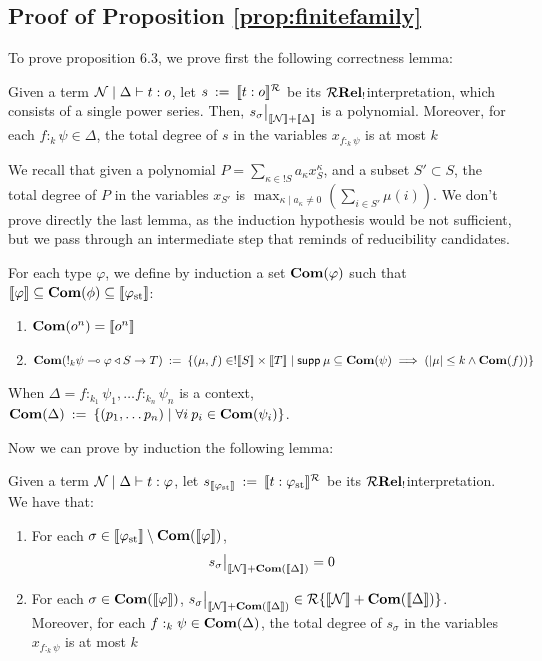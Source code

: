 \subsection{Proof of Proposition \ref{prop:finitefamily}}
To prove proposition 6.3, we prove first the following correctness lemma:
\begin{lemma}
	\label{lemma:correctness}
	Given a term $\mathcal{N}\mid\Delta\vdash t: o$, let $s \: := \: \llbracket t: o\rrbracket_{}^{\mathcal{R}} $ be its $\mathcal{R}\mathbf{Rel_!}$interpretation, which consists of a single power series. Then, $s_\sigma\big\vert_{\llbracket\mathcal{N}\rrbracket+ \llbracket\Delta\rrbracket}$ is a polynomial. Moreover, for each $f:_k \psi \in \Delta$, the total degree of $s$ in the variables $x_{f:_k \psi}$ is at most $k$
\end{lemma}
We recall that given a polynomial $ P = \sum_{\kappa \in !S} a_\kappa x_S^\kappa$, and a subset $S' \subset S$, the total degree of $P$ in the variables $x_{S'}$ is $\max_{\kappa \mid a_\kappa \neq 0} (\sum_{i \in S'} \mu(i))$.
We don't prove directly the last lemma, as the induction hypothesis would be not sufficient, but we pass through an intermediate step that reminds of reducibility candidates.
\begin{definition}
	For each type $\varphi$, we define by induction a set ${\mathbf{Com}}(\varphi)$ such that $\llbracket\varphi\rrbracket \subseteq \mathbf{Com}(\phi) \subseteq \llbracket{\varphi}_{\mathrm{st}}\rrbracket$:
	\begin{enumerate}
		\item $\mathbf{Com}(o^n)= \llbracket o^n\rrbracket$
		\item $\mathbf{Com}( !_k \psi \multimap \varphi \triangleleft S \to T) \: := \: \{(\mu, f) \in !\llbracket S\rrbracket \times \llbracket T\rrbracket\mid \mathsf{supp} \: \mu \subseteq \mathbf{Com}(\psi) \implies (|\mu| \leq k \land \mathbf{Com}(f))\}$
	\end{enumerate}
When $\Delta= f:_{k_1} \psi_1, \dots f:_{k_n} \psi_n$ is a context, $\mathbf{Com}(\Delta) \: := \: \{(p_1, \dots p_n)\mid \forall i \: p_i \in \mathbf{Com}(\psi_i)\}$.
\end{definition}
Now we can prove by induction the following lemma:
\begin{lemma}
	Given a term $\mathcal{N}\mid\Delta\vdash t: \varphi$, let $s_{\llbracket{\varphi}_{\mathrm{st}}\rrbracket} \: := \: \llbracket t: {\varphi}_{\mathrm{st}}\rrbracket^{\mathcal{R}} $ be its $\mathcal{R}\mathbf{Rel_!}$interpretation. We have that:
	\begin{enumerate}
		\item For each $\sigma \in \llbracket{\varphi}_{\mathrm{st}}\rrbracket \setminus \mathbf{Com}(\llbracket\varphi\rrbracket)$, 
		\begin{equation}
			s_\sigma\big\vert_{\llbracket\mathcal{N}\rrbracket+ \mathbf{Com}(\llbracket\Delta\rrbracket)}=0
		\end{equation}
		\item For each $\sigma \in \mathbf{Com}(\llbracket\varphi\rrbracket)$, $s_\sigma\big\vert_{\llbracket\mathcal{N}\rrbracket+ \mathbf{Com}(\llbracket\Delta\rrbracket)} \in {\mathcal{R}}\{\llbracket\mathcal{N}\rrbracket+ \mathbf{Com}(\llbracket\Delta\rrbracket)\}$. Moreover, for each $f:_k \psi \in \mathbf{Com}(\Delta)$, the total degree of $s_\sigma$ in the variables $x_{f:_k \psi}$ is at most $k$
	\end{enumerate}
\end{lemma}
